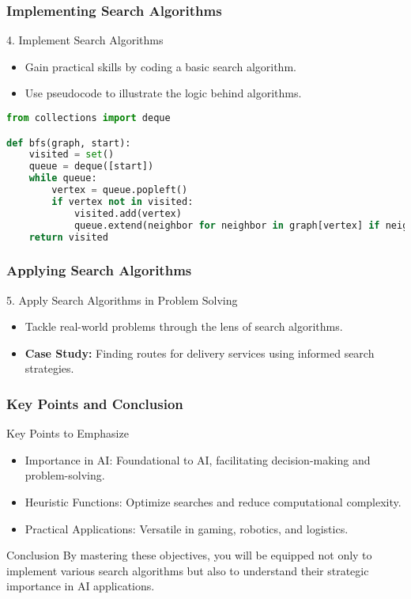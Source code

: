 \documentclass[aspectratio=169]{beamer}
\begin{document}
\begin{frame}[fragile]
    \frametitle{Implementing Search Algorithms}
    \begin{block}{4. Implement Search Algorithms}
        \begin{itemize}
            \item Gain practical skills by coding a basic search algorithm.
            \item Use pseudocode to illustrate the logic behind algorithms.
        \end{itemize}
        \begin{lstlisting}[language=Python]
from collections import deque

def bfs(graph, start):
    visited = set()
    queue = deque([start])
    while queue:
        vertex = queue.popleft()
        if vertex not in visited:
            visited.add(vertex)
            queue.extend(neighbor for neighbor in graph[vertex] if neighbor not in visited)
    return visited
        \end{lstlisting}
    \end{block}
\end{frame}

\begin{frame}[fragile]
    \frametitle{Applying Search Algorithms}
    \begin{block}{5. Apply Search Algorithms in Problem Solving}
        \begin{itemize}
            \item Tackle real-world problems through the lens of search algorithms.
            \item \textbf{Case Study:} Finding routes for delivery services using informed search strategies.
        \end{itemize}
    \end{block}
\end{frame}

\begin{frame}[fragile]
    \frametitle{Key Points and Conclusion}
    \begin{block}{Key Points to Emphasize}
        \begin{itemize}
            \item Importance in AI: Foundational to AI, facilitating decision-making and problem-solving.
            \item Heuristic Functions: Optimize searches and reduce computational complexity.
            \item Practical Applications: Versatile in gaming, robotics, and logistics.
        \end{itemize}
    \end{block}
    \begin{block}{Conclusion}
        By mastering these objectives, you will be equipped not only to implement various search algorithms but also to understand their strategic importance in AI applications.
    \end{block}
\end{frame}
\end{document}
